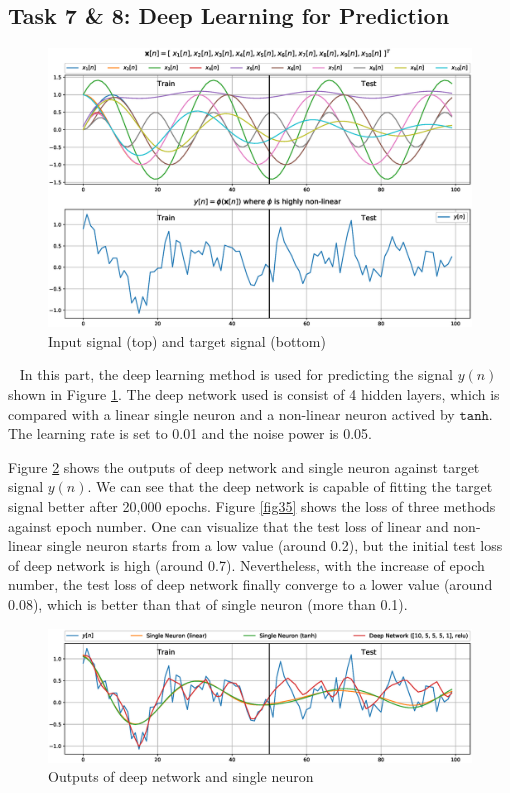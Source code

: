 \documentclass[10pt]{article}
\begin{document}
\subsection{Task 7 \& 8: Deep Learning for Prediction}
\begin{figure}[H]
    \centering
	\includegraphics[width=1\textwidth]{fig/4.7_1.eps}

    \caption{Input signal (top) and target signal (bottom)}
    \label{fig33}
\end{figure}
\ \indent
In this part, the deep learning method is used for predicting the signal $y(n)$ shown 
in Figure \ref{fig33}. The deep network used is consist of 4 hidden layers, which is 
compared with a linear single neuron and a non-linear neuron actived by $\mathtt{tanh}$.
The learning rate is set to 0.01 and the noise power is 0.05.

Figure \ref{fig34} shows the outputs of deep network and single neuron against target signal $y(n)$.
We can see that the deep network is capable of fitting the target signal better after
20,000 epochs. Figure \ref{fig35} shows the loss of three methods against epoch number.
One can visualize that the test loss of linear and non-linear single neuron starts from a 
low value (around 0.2), but the initial test loss of deep network is high (around 0.7).
Nevertheless, with the increase of epoch number, the test loss of deep network finally 
converge to a lower value (around 0.08), which is better than that of single neuron (more than 0.1).

\begin{figure}[H]
    \centering
	\includegraphics[width=1\textwidth]{fig/4.7_2.eps}

    \caption{Outputs of deep network and single neuron}
    \label{fig34}
\end{figure}
\end{document}
